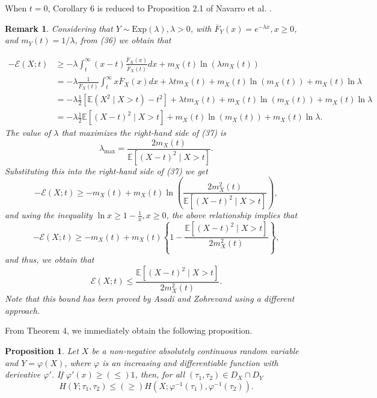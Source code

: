 \documentclass[11pt]{article}
\newtheorem{proposition}{Proposition}
\newtheorem{remark}{Remark}
\begin{document}
When $t=0$, Corollary 6 is reduced to Proposition 2.1 of Navarro et al. \cite{Navarro2010}.

\begin{remark}
	Considering that $Y \sim \text{Exp}(\lambda), \lambda > 0$, with $\overline{F}_Y (x) = e^{-\lambda x}, x \geq 0$, and $m_Y (t) = 1/\lambda$, from (36) we obtain that
	
	\begin{align}
		\textstyle -\mathcal{E}(X;t) &\geq -\lambda \int_t^\infty (x-t) \frac{\overline{F}_X(x)}{\overline{F}_X(t)} dx + m_X(t) \ln(\lambda m_X(t)) \nonumber \\
		& \textstyle = -\lambda \frac{1}{\overline{F}_X(t)} \int_t^\infty x \overline{F}_X(x) dx + \lambda t m_X(t) + m_X(t) \ln(m_X(t)) + m_X(t) \ln \lambda \nonumber \\
		&\textstyle = -\lambda \frac{1}{2} \left[ \mathbb{E}(X^2 \mid X > t) - t^2 \right] + \lambda t m_X(t) + m_X(t) \ln(m_X(t)) + m_X(t) \ln \lambda \nonumber \\
		&\textstyle = -\lambda \frac{1}{2} \mathbb{E}[(X - t)^2 \mid X > t] + m_X(t) \ln(m_X(t)) + m_X(t) \ln \lambda.
	\end{align}
	The value of $\lambda$ that maximizes the right-hand side of (37) is
	$$ \lambda_{\max} = \frac{2 m_X(t)}{\mathbb{E}[(X - t)^2 \mid X > t]}. $$
	Substituting this into the right-hand side of (37) we get
	$$ \textstyle -\mathcal{E}(X;t) \geq -m_X(t) + m_X(t) \ln \left( \frac{2 m_X^2(t)}{\mathbb{E}[(X - t)^2 \mid X > t]} \right), $$
	and using the inequality $\ln x \geq 1 - \frac{1}{x}, x \geq 0$, the above relationship implies that
	$$ \textstyle -\mathcal{E}(X;t) \geq -m_X(t) + m_X(t) \left\{ 1 - \frac{\mathbb{E}[(X - t)^2 \mid X > t]}{2 m_X^2(t)} \right\}, $$
	and thus, we obtain that
	$$ \mathcal{E}(X;t) \leq \frac{\mathbb{E}[(X - t)^2 \mid X > t]}{2 m_X^2(t)}. $$
	Note that this bound has been proved by Asadi and Zohrevand \cite[Theorem 4.10]{Asadi2007} using a different approach.
\end{remark}

From Theorem 4, we immediately obtain the following proposition.

 
\begin{proposition} 
	Let $X$ be a non-negative absolutely continuous random variable and $Y = \varphi(X)$, where $\varphi$ is an increasing and differentiable function with derivative $\varphi'$. If $\varphi'(x) \geq (\leq) 1$, then, for all $(\tau_1, \tau_2) \in D_X \cap D_Y$
	$$ \textstyle H(Y;\tau_1,\tau_2) \leq (\geq) H(X;\varphi^{-1}(\tau_1), \varphi^{-1}(\tau_2)). $$
\end{proposition}
\end{document}
